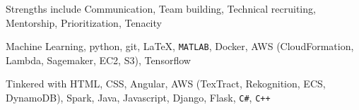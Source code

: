 

\begin{cvskills}
  \cvskill
    {Strengths include} %
    {Communication, Team building, Technical recruiting, Mentorship, Prioritization, Tenacity} %

    {Machine Learning, python, git, \LaTeX, {\texttt{MATLAB}}, Docker, AWS (CloudFormation, Lambda, Sagemaker, EC2, S3), Tensorflow} %

  \cvskill
    {Tinkered with} %
    {HTML, CSS, Angular, AWS (TexTract, Rekognition, ECS, DynamoDB), Spark, Java, Javascript, Django, Flask,
      {\texttt{C\#}}, {\texttt{C++}}} %


\end{cvskills}
